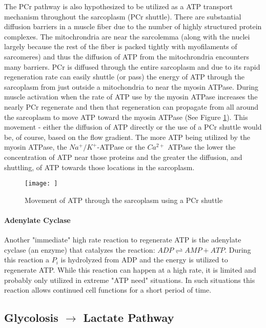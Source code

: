 
The PCr pathway is also hypothesized to be utilized as a ATP transport mechanism throughout the sarcoplasm (PCr shuttle). There are substantial diffusion barriers in a muscle fiber due to the number of highly structured protein complexes. The mitochrondria are near the sarcolemma (along with the nuclei largely because the rest of the fiber is packed tightly with myofilaments of sarcomeres) and thus the diffusion of ATP from the mitochrondria encounters many barriers.  PCr is diffused through the entire sarcoplasm and due to its rapid regeneration rate can easily shuttle (or pass) the energy of ATP through the sarcoplasm from just outside a mitochondria to near the myosin ATPase. During muscle activation when the rate of ATP use by the myosin ATPase increases the nearly PCr regenerate and then that regeneration can propagate from all around the sarcoplasm to move ATP toward the myosin ATPase (See Figure \ref{fig:PCr}). This movement - either the diffusion of ATP directly or the use of a PCr shuttle would be, of course, based on the flow gradient. The more ATP being utilized by the myosin ATPase, the $Na^+/K^+$-ATPase or the $Ca^{2+}$ ATPase the lower the concentration of ATP near those proteins and the greater the diffusion, and shuttling, of ATP towards those locations in the sarcoplasm.

\begin{figure}[h!]
    \centering
    \texttt{[image: ]}
    \caption{Movement of ATP through the sarcoplasm using a PCr shuttle}
    \label{fig:PCr}
\end{figure}

\paragraph{Adenylate Cyclase}

Another "immediate" high rate reaction to regenerate ATP is the adenylate cyclase (an enzyme) that catalyzes the reaction: $ADP \rightleftharpoons AMP + ATP$. During this reaction a $P_i$ is hydrolyzed from ADP and the energy is utilized to regenerate ATP. While this reaction can happen at a high rate, it is limited and probably only utilized in extreme "ATP need" situations. In such situations this reaction allows continued cell functions for a short period of time. 

\subsection{Glycolosis $\rightarrow$ Lactate Pathway}

